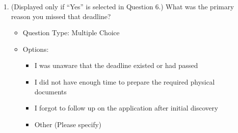 \begin{enumerate}[resume=q, label={Question \arabic*:}, leftmargin=*, align=left]
\begin{itemize}[leftmargin=*]
  \end{itemize}
  \item (Displayed only if ``Yes'' is selected in Question 6.) What was the primary reason you missed that deadline?
  \begin{itemize}[leftmargin=*]
    \item Question Type: Multiple Choice
    \item Options:
    \begin{itemize}[leftmargin=*]
      \item I was unaware that the deadline existed or had passed
      \item I did not have enough time to prepare the required physical documents
      \item I forgot to follow up on the application after initial discovery
      \item Other (Please specify)
    \end{itemize}
  \end{itemize}
\end{enumerate}
